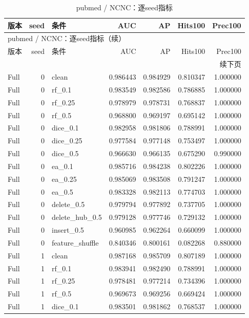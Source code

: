 \documentclass[UTF8,a4paper,11pt,fontset=fandol]{ctexart}
\begin{document}
{\footnotesize
\setlength{\tabcolsep}{3pt}
\begin{longtable}{lrlrrrr}
\caption{pubmed / NCNC：逐seed指标}\\
\toprule
版本 & seed & 条件 & AUC & AP & Hits100 & Prec100 \\
\midrule
\endfirsthead
\multicolumn{7}{l}{pubmed / NCNC：逐seed指标（续）}\\
\toprule
版本 & seed & 条件 & AUC & AP & Hits100 & Prec100 \\
\midrule
\endhead
\midrule\multicolumn{7}{r}{续下页}\\
\endfoot
\bottomrule\endlastfoot
Full & 0 & clean & 0.986443 & 0.984929 & 0.810347 & 1.000000 \\
Full & 0 & rf\_0.1 & 0.983549 & 0.982586 & 0.786885 & 1.000000 \\
Full & 0 & rf\_0.25 & 0.978979 & 0.978731 & 0.768837 & 1.000000 \\
Full & 0 & rf\_0.5 & 0.968800 & 0.969197 & 0.695142 & 1.000000 \\
Full & 0 & dice\_0.1 & 0.982958 & 0.981806 & 0.788991 & 1.000000 \\
Full & 0 & dice\_0.25 & 0.977584 & 0.977148 & 0.753497 & 1.000000 \\
Full & 0 & dice\_0.5 & 0.966630 & 0.966135 & 0.675290 & 0.990000 \\
Full & 0 & ea\_0.1 & 0.985716 & 0.984238 & 0.802226 & 1.000000 \\
Full & 0 & ea\_0.25 & 0.985069 & 0.983508 & 0.791247 & 1.000000 \\
Full & 0 & ea\_0.5 & 0.983328 & 0.982113 & 0.774703 & 1.000000 \\
Full & 0 & delete\_0.5 & 0.979794 & 0.977892 & 0.737705 & 1.000000 \\
Full & 0 & delete\_hub\_0.5 & 0.979128 & 0.977746 & 0.729132 & 1.000000 \\
Full & 0 & insert\_0.5 & 0.960985 & 0.962264 & 0.660099 & 1.000000 \\
Full & 0 & feature\_shuffle & 0.840346 & 0.800161 & 0.082268 & 0.880000 \\
Full & 1 & clean & 0.987168 & 0.985709 & 0.807189 & 1.000000 \\
Full & 1 & rf\_0.1 & 0.983941 & 0.982490 & 0.788991 & 1.000000 \\
Full & 1 & rf\_0.25 & 0.978481 & 0.977214 & 0.734396 & 1.000000 \\
Full & 1 & rf\_0.5 & 0.969673 & 0.969256 & 0.669424 & 1.000000 \\
Full & 1 & dice\_0.1 & 0.983501 & 0.981862 & 0.768537 & 1.000000 \\

\end{longtable}}
\end{document}

